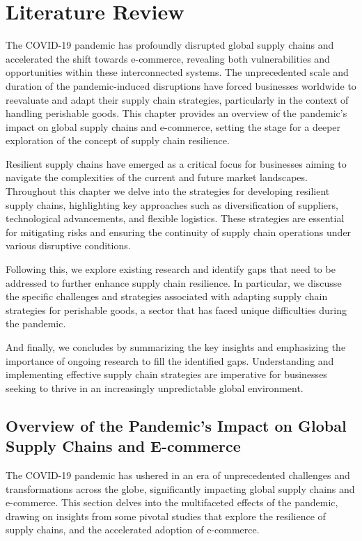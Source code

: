 \chapter{Literature Review}
\label{chap:literature}

The COVID-19 pandemic has profoundly disrupted global supply chains and accelerated the shift towards e-commerce, revealing both vulnerabilities and opportunities within these interconnected systems. The unprecedented scale and duration of the pandemic-induced disruptions have forced businesses worldwide to reevaluate and adapt their supply chain strategies, particularly in the context of handling perishable goods. This chapter provides an overview of the pandemic's impact on global supply chains and e-commerce, setting the stage for a deeper exploration of the concept of supply chain resilience.

Resilient supply chains have emerged as a critical focus for businesses aiming to navigate the complexities of the current and future market landscapes. Throughout this chapter we delve into the strategies for developing resilient supply chains, highlighting key approaches such as diversification of suppliers, technological advancements, and flexible logistics. These strategies are essential for mitigating risks and ensuring the continuity of supply chain operations under various disruptive conditions.

Following this, we explore existing research and identify gaps that need to be addressed to further enhance supply chain resilience. In particular, we discusse the specific challenges and strategies associated with adapting supply chain strategies for perishable goods, a sector that has faced unique difficulties during the pandemic.

And finally, we concludes by summarizing the key insights and emphasizing the importance of ongoing research to fill the identified gaps. Understanding and implementing effective supply chain strategies are imperative for businesses seeking to thrive in an increasingly unpredictable global environment.

\section{Overview of the Pandemic's Impact on Global Supply Chains and E-commerce}

The COVID-19 pandemic has ushered in an era of unprecedented challenges and transformations across the globe, significantly impacting global supply chains and e-commerce. This section delves into the multifaceted effects of the pandemic, drawing on insights from some pivotal studies that explore the resilience of supply chains, and the accelerated adoption of e-commerce.

